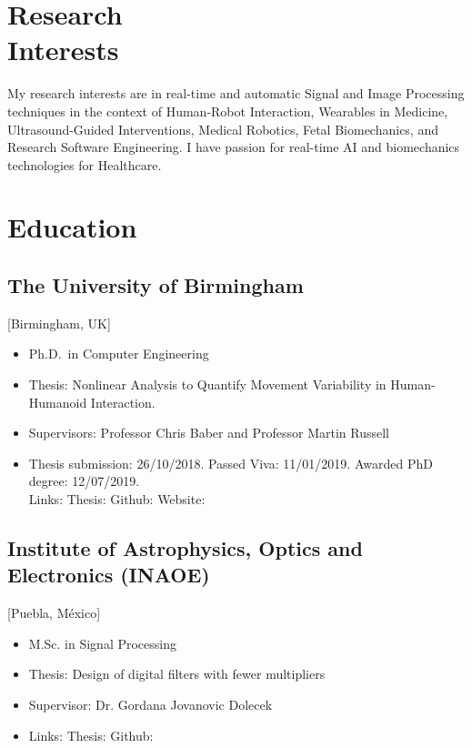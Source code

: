 \documentclass{mycv}
\begin{document}
\maketitle

\section{Research \\ Interests}
My research interests are in real-time and automatic Signal and Image Processing techniques in the context of Human-Robot Interaction, Wearables in Medicine, Ultrasound-Guided Interventions, Medical Robotics, Fetal Biomechanics, and Research Software Engineering.
I have passion for real-time AI and biomechanics technologies for Healthcare.

\section{Education}
\subsection{The University of Birmingham}[Birmingham, UK]
\vspace{-\parskip}%
\begin{itemize}[label={}]
  \item Ph.D.\ in Computer Engineering 
  \item Thesis: Nonlinear Analysis to Quantify Movement Variability in Human-Humanoid Interaction.   
  \item Supervisors: Professor Chris Baber and  Professor Martin Russell
  \item	Thesis submission: 26/10/2018. Passed Viva: 11/01/2019. Awarded PhD degree: 12/07/2019. \\
	Links: Thesis: \href{https://doi.org/10.5281/zenodo.3384145}{\faFilePdfO}
	Github: \href{http://doi.org/10.5281/zenodo.3384281}{\faGithubAlt}
	Website: \href{https://mxochicale-phd.github.io/site/}{\faExternalLink} 
\end{itemize}

\subsection{Institute of Astrophysics, Optics and Electronics (INAOE)}[Puebla, M\'exico]
\vspace{-\parskip}%
\begin{itemize}[label={}]
  \item M.Sc. in Signal Processing 
  \item Thesis: Design of digital filters with fewer multipliers
  \item Supervisor: Dr. Gordana Jovanovic Dolecek
  \item	Links: 
	Thesis: \href{https://github.com/mxochicale/publications/blob/master/thesis/M.Sc./doc/MPXochicale_MScThesis-2016.pdf}{\faFilePdfO}
	Github: \href{https://github.com/mxochicale/publications/tree/master/thesis/M.Sc.}{\faGithubAlt}
\end{itemize}
\end{document}
